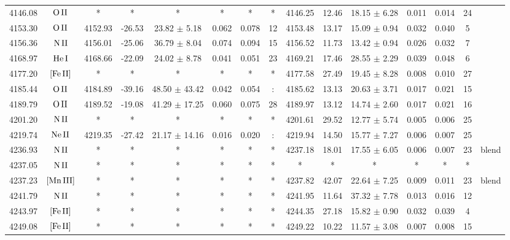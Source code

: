 \documentclass{article}
\begin{document}
\begin{table*}
\begin{adjustbox}{width=\textwidth}
\begin{tabular}{ccccccccccccccc}
4146.08 & $\mbox{O}\thinspace \mbox{II}$ & * & * & * & * & * & * & 4146.25 & 12.46 & 18.15 $\pm$ 6.28 & 0.011 & 0.014 & 24 &  \\
4153.30 & $\mbox{O}\thinspace \mbox{II}$ & 4152.93 & -26.53 & 23.82 $\pm$ 5.18 & 0.062 & 0.078 & 12 & 4153.48 & 13.17 & 15.09 $\pm$ 0.94 & 0.032 & 0.040 & 5 &  \\
4156.36 & $\mbox{N}\thinspace \mbox{II}$ & 4156.01 & -25.06 & 36.79 $\pm$ 8.04 & 0.074 & 0.094 & 15 & 4156.52 & 11.73 & 13.42 $\pm$ 0.94 & 0.026 & 0.032 & 7 &  \\
4168.97 & $\mbox{He}\thinspace \mbox{I}$ & 4168.66 & -22.09 & 24.02 $\pm$ 8.78 & 0.041 & 0.051 & 23 & 4169.21 & 17.46 & 28.55 $\pm$ 2.29 & 0.039 & 0.048 & 6 &  \\
4177.20 & $\mbox{[Fe}\thinspace \mbox{II]}$ & * & * & * & * & * & * & 4177.58 & 27.49 & 19.45 $\pm$ 8.28 & 0.008 & 0.010 & 27 &  \\
4185.44 & $\mbox{O}\thinspace \mbox{II}$ & 4184.89 & -39.16 & 48.50 $\pm$ 43.42 & 0.042 & 0.054 & : & 4185.62 & 13.13 & 20.63 $\pm$ 3.71 & 0.017 & 0.021 & 15 &  \\
4189.79 & $\mbox{O}\thinspace \mbox{II}$ & 4189.52 & -19.08 & 41.29 $\pm$ 17.25 & 0.060 & 0.075 & 28 & 4189.97 & 13.12 & 14.74 $\pm$ 2.60 & 0.017 & 0.021 & 16 &  \\
4201.20 & $\mbox{N}\thinspace \mbox{II}$ & * & * & * & * & * & * & 4201.61 & 29.52 & 12.77 $\pm$ 5.74 & 0.005 & 0.006 & 25 &  \\
4219.74 & $\mbox{Ne}\thinspace \mbox{II}$ & 4219.35 & -27.42 & 21.17 $\pm$ 14.16 & 0.016 & 0.020 & : & 4219.94 & 14.50 & 15.77 $\pm$ 7.27 & 0.006 & 0.007 & 25 &  \\
4236.93 & $\mbox{N}\thinspace \mbox{II}$ & * & * & * & * & * & * & 4237.18 & 18.01 & 17.55 $\pm$ 6.05 & 0.006 & 0.007 & 23 &  blend \\
4237.05 & $\mbox{N}\thinspace \mbox{II}$ & * & * & * & * & * & * & * & * & * & * & * & * &  \\
4237.23 & $\mbox{[Mn}\thinspace \mbox{III]}$ & * & * & * & * & * & * & 4237.82 & 42.07 & 22.64 $\pm$ 7.25 & 0.009 & 0.011 & 23 &  blend \\
4241.79 & $\mbox{N}\thinspace \mbox{II}$ & * & * & * & * & * & * & 4241.95 & 11.64 & 37.32 $\pm$ 7.78 & 0.013 & 0.016 & 12 &  \\
4243.97 & $\mbox{[Fe}\thinspace \mbox{II]}$ & * & * & * & * & * & * & 4244.35 & 27.18 & 15.82 $\pm$ 0.90 & 0.032 & 0.039 & 4 &  \\
4249.08 & $\mbox{[Fe}\thinspace \mbox{II]}$ & * & * & * & * & * & * & 4249.22 & 10.22 & 11.57 $\pm$ 3.08 & 0.007 & 0.008 & 15 &  \\

\end{tabular}
\end{adjustbox}
\end{table*}
\end{document}
